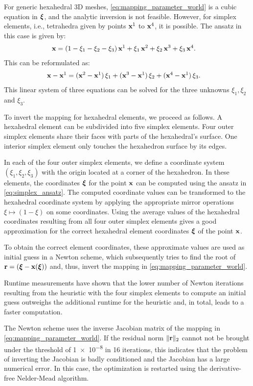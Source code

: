 For generic hexahedral 3D meshes, \cref{eq:mapping_parameter_world} is a cubic equation in $\boldsymbol{\xi}$, and the analytic inversion is not feasible. However, for simplex elements, i.e., tetrahedra given by points $\textbf{x}^1$ to $\textbf{x}^4$, it is possible. The ansatz in this case is given by:
\begin{align*}
  \textbf{x} &= (1-\xi_1-\xi_2-\xi_3)\,\textbf{x}^1 + \xi_1\,\textbf{x}^2 + \xi_2\,\textbf{x}^3 + \xi_3\,\textbf{x}^4.
\end{align*}
This can be reformulated as:
\begin{align}\label{eq:simplex_ansatz}
   \textbf{x}-\textbf{x}^1 &= (\textbf{x}^2 - \textbf{x}^1)\,\xi_1 + (\textbf{x}^3  - \textbf{x}^1)\,\xi_2 + (\textbf{x}^4 - \textbf{x}^1)\,\xi_3.
\end{align}
This linear system of three equations can be solved for the three unknowns $\xi_1,\xi_2$ and $\xi_3$.

To invert the mapping for hexahedral elements, we proceed as follows.
A hexahedral element can be subdivided into five simplex elements. 
Four outer simplex elements share their faces with parts of the hexahedral's surface. One interior simplex element only touches the hexahedron surface by its edges. 

In each of the four outer simplex elements, we define a coordinate system $(\xi_1,\xi_2,\xi_3)$ with the origin located at a corner of the hexahedron. 
In these elements, the coordinates $\boldsymbol{\xi}$ for the point $\textbf{x}$ can be computed  using the ansatz in \cref{eq:simplex_ansatz}. The computed coordinate values can be transformed to the hexahedral coordinate system by applying the appropriate mirror operations $\xi \mapsto (1-\xi)$ on some coordinates. Using the average values of the hexahedral coordinates resulting from all four outer simplex elements gives a good approximation for the correct hexahedral element coordinates $\boldsymbol{\xi}$ of the point $\textbf{x}$.

To obtain the correct element coordinates, these approximate values are used as initial guess in a Newton scheme, which subsequently tries to find the root of $\textbf{r} = (\boldsymbol{\xi} - \textbf{x}(\boldsymbol{\xi}))$ and, thus, invert the mapping in \cref{eq:mapping_parameter_world}. 

Runtime measurements have shown that the lower number of Newton iterations resulting from the heuristic with the four simplex elements to compute an initial guess outweighs the additional runtime for the heuristic and, in total, leads to a faster computation.

The Newton scheme uses the inverse Jacobian matrix of the mapping in \cref{eq:mapping_parameter_world}. If the residual norm $\Vert\textbf{r}\Vert_2$ cannot not be brought under the threshold of \num{1e-8} in 16 iterations, this indicates that the problem of inverting the Jacobian is badly conditioned and the Jacobian has a large numerical error. In this case, the optimization is restarted using the derivative-free Nelder-Mead algorithm.

